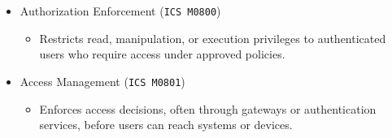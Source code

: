 \documentclass[10pt,a4paper,oneside]{report}
\begin{document}
\begin{itemize}
\begin{itemize}
\begin{itemize}
\end{itemize}
\item Authorization Enforcement (\texttt{ICS M0800})
\begin{itemize}
\item Restricts read, manipulation, or execution privileges to authenticated users who require access under approved policies.
\end{itemize}
\item Access Management (\texttt{ICS M0801})
\begin{itemize}
\item Enforces access decisions, often through gateways or authentication services, before users can reach systems or devices.
\end{itemize}
\end{itemize}
\end{itemize}
\end{document}
